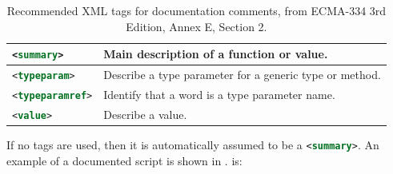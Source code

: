\documentclass[fsharpnotes.tex]{subfiles}
\begin{document}
\begin{table}
\begin{tabularx}{\linewidth}{|l|X|}
    \hline
    \lstinline[language=xml]!<summary>! &Main description of a function or value.\\
    \hline
    \lstinline[language=xml]!<typeparam>! &Describe a type parameter for a generic type or method.\\
    \hline
    \lstinline[language=xml]!<typeparamref>! &Identify that a word is a type parameter name.\\
    \hline
    \lstinline[language=xml]!<value>! &Describe a value.\\
    \hline
  \end{tabularx}
  \caption{Recommended XML tags for documentation comments, from ECMA-334 3rd Edition, Annex E, Section 2.}
  \label{tab:xmlTags}
\end{table}
If no tags are used, then it is automatically assumed to be a \lstinline[language=xml]!<summary>!. An example of a documented script is shown in .
is:
%
%
\end{document}
